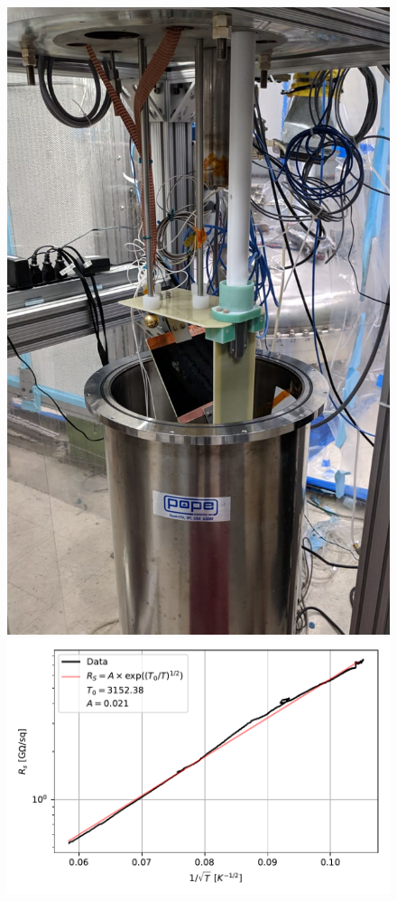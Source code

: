 \begin{figure}[htbp]
\centering
\begin{minipage}[b]{.295\textwidth}
\includegraphics[width=\linewidth]{graphics/lartpc/FieldCage/ir2_2.jpeg}
\vspace{2mm}
\end{minipage}
\qquad
\begin{minipage}[b]{.4\textwidth}
\includegraphics[width=\linewidth]{graphics/lartpc/FieldCage/ir2_temp_scan.pdf}

\end{minipage}
\end{figure}
